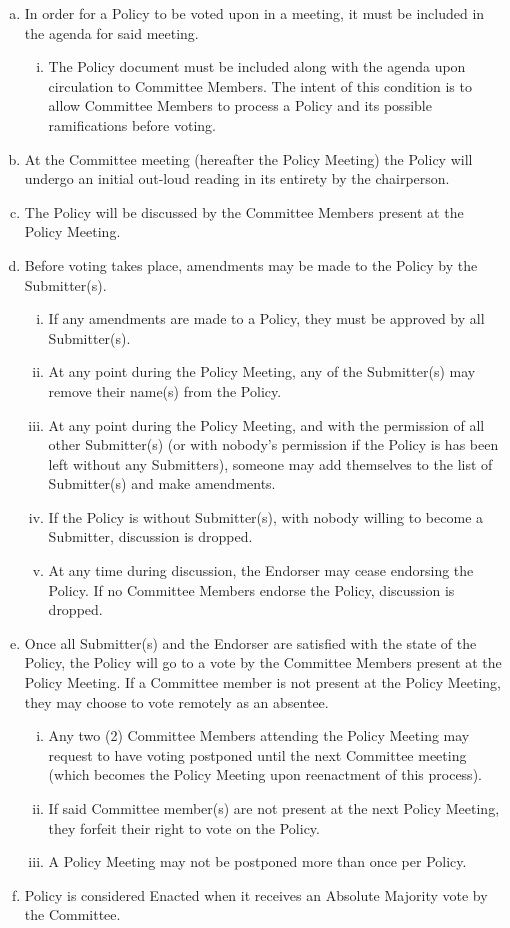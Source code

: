 \documentclass[a4paper,12pt]{article}
\begin{document}
\begin{enumerate}[a)]
	\item In order for a Policy to be voted upon in a meeting, it must be included in the agenda for said meeting.
	\begin{enumerate}[i)]
		\item The Policy document must be included along with the agenda upon circulation to Committee Members. The intent of this condition is to allow Committee Members to process a Policy and its possible ramifications before voting.
	\end{enumerate}
	\item At the Committee meeting (hereafter the Policy Meeting) the Policy will undergo an initial out-loud reading in its entirety by the chairperson.
	\item The Policy will be discussed by the Committee Members present at the Policy Meeting.
	\item Before voting takes place, amendments may be made to the Policy by the Submitter(s).
	\begin{enumerate}[i)]
		\item If any amendments are made to a Policy, they must be approved by all Submitter(s).
		\item At any point during the Policy Meeting, any of the Submitter(s) may remove their name(s) from the Policy.
		\item At any point during the Policy Meeting, and with the permission of all other Submitter(s) (or with nobody's permission if the Policy is has been left without any Submitters), someone may add themselves to the list of Submitter(s) and make amendments.
		\item If the Policy is without Submitter(s), with nobody willing to become a Submitter, discussion is dropped.
		\item At any time during discussion, the Endorser may cease endorsing the Policy. If no Committee Members endorse the Policy, discussion is dropped.
	\end{enumerate}
	\item Once all Submitter(s) and the Endorser are satisfied with the state of the Policy, the Policy will go to a vote by the Committee Members present at the Policy Meeting. If a Committee member is not present at the Policy Meeting, they may choose to vote remotely as an absentee.
	\begin{enumerate}[i)]
		\item Any two (2) Committee Members attending the Policy Meeting may request to have voting postponed until the next Committee meeting (which becomes the Policy Meeting upon reenactment of this process).
		\item If said Committee member(s) are not present at the next Policy Meeting, they forfeit their right to vote on the Policy.
		\item A Policy Meeting may not be postponed more than once per Policy.
	\end{enumerate}
	\item Policy is considered Enacted when it receives an Absolute Majority vote by the Committee.
\end{enumerate}
\end{document}
